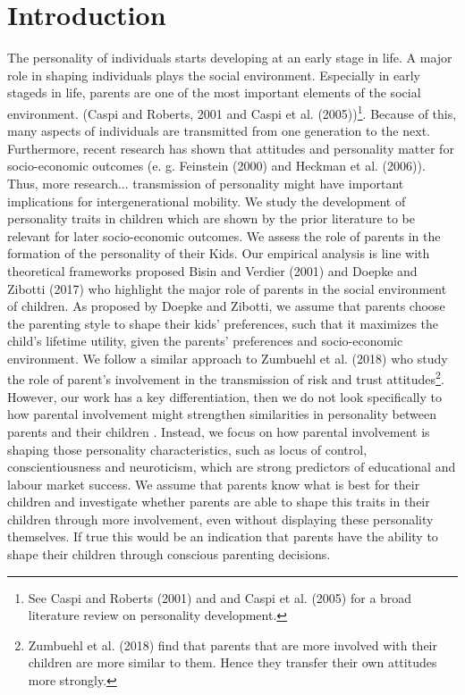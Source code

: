 \documentclass[%
    a4paper,            %
    11pt,               %
    bibliography=totoc, %
]
{scrartcl}
\begin{document}
\section{Introduction}
The personality of individuals starts developing at an early stage in life. A major role in shaping individuals plays the social environment. Especially in early stageds in life, parents are one of the most important elements of the social environment. (Caspi and Roberts, 2001 and Caspi et al. (2005))\footnote{See Caspi and Roberts (2001) and and Caspi et al. (2005) for a broad literature review on personality development.}. Because of this, many aspects of individuals are transmitted from one generation to the next. Furthermore, recent research has shown that attitudes and personality matter for socio-economic outcomes (e. g. Feinstein (2000) and Heckman et al. (2006)).  Thus, more research... transmission of personality might have important implications for intergenerational mobility.\newline
We study the development of personality traits in children which are shown by the prior literature to be relevant for later socio-economic outcomes. We assess the role of parents in the formation of the personality of their Kids. Our empirical analysis is line with theoretical frameworks proposed Bisin and Verdier (2001) and Doepke and Zibotti (2017) who highlight the major role of parents in the social environment of children. As proposed by Doepke and Zibotti, we assume that parents choose the parenting style to shape their kids’ preferences, such that it maximizes the child’s lifetime utility, given the parents’ preferences and socio-economic environment.\newline
We follow a similar approach to Zumbuehl et al. (2018) who study the role of parent’s involvement in the transmission of risk and trust attitudes\footnote{  Zumbuehl et al. (2018) find that parents that are more involved with their children are more similar to them. Hence they transfer their own attitudes more strongly.}. However, our work has a key differentiation, then we do not look specifically to how parental involvement might strengthen similarities in personality between parents and their children . Instead, we focus on how parental involvement is shaping those personality characteristics, such as locus of control, conscientiousness and neuroticism, which are strong predictors of educational and labour market success. We assume that parents know what is best for their children and investigate whether parents are able to shape this traits in their children through more involvement, even without displaying these personality themselves. If true this would be an indication that parents have the ability to shape their children through conscious parenting decisions. \newline
\end{document}

